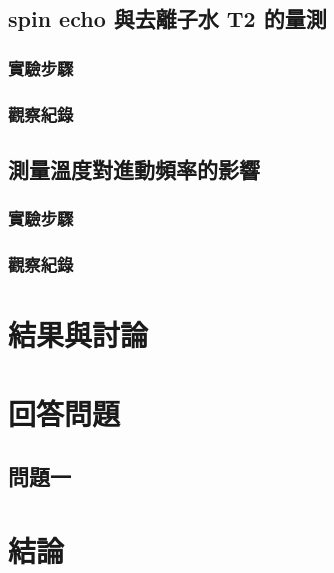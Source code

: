 \documentclass[twocolumn]{article}
\begin{document}
\subsection{spin echo 與去離子水 T2 的量測}
\subsubsection*{實驗步驟}
\subsubsection*{觀察紀錄}

\subsection{測量溫度對進動頻率的影響}
\subsubsection*{實驗步驟}
\subsubsection*{觀察紀錄}

\section{結果與討論}












\section{回答問題}

\newcommand\question[1]{
  \fbox{\parbox{\dimexpr\linewidth - 2\fboxrule - 2\fboxsep}{#1}}\vspace{2mm}
}

\subsection{問題一}\label{Q1}

\question{
}

\section{結論}



\end{document}
